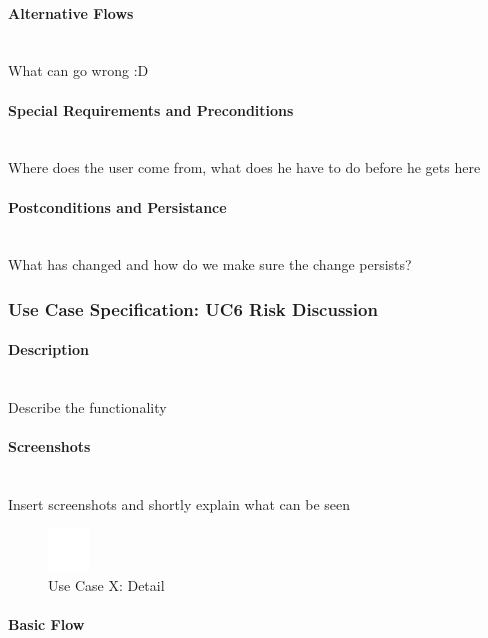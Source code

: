 \paragraph*{Alternative Flows}\mbox{}\\
What can go wrong :D

\paragraph*{Special Requirements and Preconditions}\mbox{}\\
Where does the user come from, what does he have to do before he gets here

\paragraph*{Postconditions and Persistance}\mbox{}\\
What has changed and how do we make sure the change persists?

\newpage
\subsubsection{Use Case Specification: \ac{UC}6 Risk Discussion}
\label{sec:domainBbg}

\paragraph*{Description}\mbox{}\\
Describe the functionality

\paragraph*{Screenshots}\mbox{}\\
Insert screenshots and shortly explain what can be seen
\begin{figure}[h] 
	\centering
	\includegraphics[width=0.1\textwidth]{Content/Domain/placeholder.png}
	\caption{Use Case X: Detail}
	\label{fig:label6}
\end{figure}

\paragraph*{Basic Flow} \mbox{}\\

